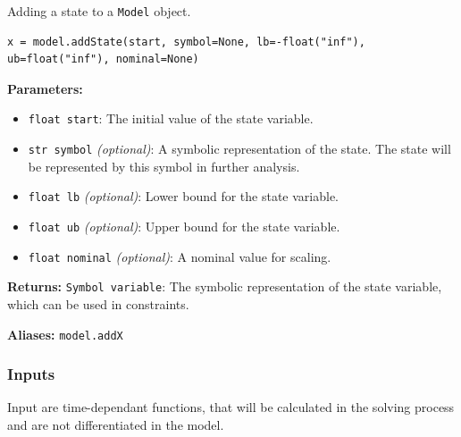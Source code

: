 \documentclass[12pt]{article}
\begin{document}
	
\begin{mdframed}[backgroundcolor=gray!10, roundcorner=10pt, linewidth=1pt]
	
	Adding a state to a \texttt{Model} object.
	
	\begin{lstlisting}
x = model.addState(start, symbol=None, lb=-float("inf"), ub=float("inf"), nominal=None)
	\end{lstlisting}

	\textbf{Parameters:}
	\begin{itemize}
		\item \texttt{float start}: The initial value of the state variable.
		\item \texttt{str symbol} \emph{(optional)}: A symbolic representation of the state. The state will be represented by this symbol in further analysis.
		\item \texttt{float lb} \emph{(optional)}: Lower bound for the state variable.
		\item \texttt{float ub} \emph{(optional)}: Upper bound for the state variable.
		\item \texttt{float nominal} \emph{(optional)}: A nominal value for scaling.
	\end{itemize}
	
	\textbf{Returns:} 
	\texttt{Symbol variable}: The symbolic representation of the state variable, which can be used in constraints.
	
	\textbf{Aliases:} \texttt{model.addX}
\end{mdframed}


	\subsubsection{Inputs}
	
	Input are time-dependant functions, that will be calculated in the solving process and are not differentiated in the model.
	
\end{document}
